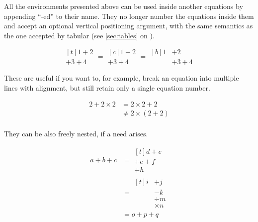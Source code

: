 All the environments presented above can be used inside another equations by
appending \enquote{-ed} to their name. They no longer number the equations
inside them and accept an optional vertical positioning argument, with the
same semantics as the one accepted by tabular (see \autoref{sec:tables} on
).
\begin{example}
\[
  \begin{multlined}[t]
    1 + 2 \\
    + 3 + 4
  \end{multlined} =
  \begin{gathered}[c]
    1 + 2 \\
    + 3 + 4
  \end{gathered} =
  \begin{aligned}[b]
    1 & + 2 \\
      & + 3 + 4
  \end{aligned}
\]
\end{example}
These are useful if you want to, for example, break an equation into multiple
lines with alignment, but still retain only a single equation number.
\begin{example}
\begin{equation}
  \begin{aligned}
    2 + 2 \times 2 
      &= 2 \times 2 + 2 \\ 
      &\neq 2 \times (2 + 2) \\ 
  \end{aligned}
\end{equation}
\end{example}
They can be also freely nested, if a need arises.
\begin{example}
\begin{align}
  a + b + c
    &= \begin{multlined}[t]
      d + e \\
      + e + f \\
      + h
    \end{multlined} \\
    &= \begin{aligned}[t]
      i &+ j \\
        &- k \\
        &\div m \\
        &\times n
    \end{aligned} \\
    &= o + p + q
\end{align}
\end{example}

